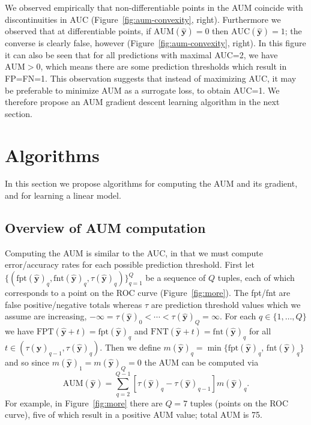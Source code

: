 \documentclass{article}
\begin{document}
We observed empirically that non-differentiable points in the AUM coincide with discontinuities in AUC (Figure~\ref{fig:aum-convexity}, right).
Furthermore we observed that at differentiable points, 
if $\text{AUM}(\mathbf{\hat y})=0$ then
$\text{AUC}(\mathbf{\hat y})=1$; 
the converse is clearly false, however (Figure~\ref{fig:aum-convexity}, right).
In this figure it can also be seen that for all predictions with maximal AUC=2, we have $\text{AUM}>0$, which means there are some prediction thresholds which result in FP=FN=1.
This observation suggests that instead of maximizing AUC, it may be preferable to minimize AUM as a surrogate loss, to obtain AUC=1. 
We therefore propose an AUM gradient descent learning algorithm in the next section.

\section{Algorithms}
\label{sec:algorithms}

In this section we propose algorithms for computing the AUM and its gradient, and for learning a linear model.

\subsection{Overview of AUM computation}
\label{sec:algo-aum-overview}
Computing the AUM is similar to the AUC, in that we must compute error/accuracy rates for each possible prediction threshold. 
First let $\{(
\text{fpt}
(\mathbf {\hat y})
_q, \text{fnt}
(\mathbf {\hat y})
_q,
 \tau
(\mathbf {\hat y})
_q
)\}_{q=1}^Q$ 
be a sequence of $Q$ tuples, each of which corresponds to a point on the ROC curve (Figure~\ref{fig:more}).
The fpt/fnt are false positive/negative totals whereas $\tau$ are prediction threshold values 
which we assume are increasing, $ -\infty = \tau
(\mathbf {\hat y})
_0 < \cdots <  \tau
(\mathbf {\hat y})
_Q = \infty$.
For each $q\in\{1,\dots,Q\}$ we have 
$\text{FPT}(\mathbf{\hat y}+t)=\text{fpt}(\mathbf {\hat y})_q$
and
$\text{FNT}(\mathbf{\hat y}+t)=\text{fnt}(\mathbf {\hat y})_q$
for all $t\in(\tau(\mathbf {\hat y})_{q-1}, \tau(\mathbf {\hat y})_q)$.
Then we define $m(\mathbf {\hat y})_q = \min\{
    \text{fpt}(\mathbf {\hat y})_q , \, 
    \text{fnt}(\mathbf {\hat y})_q
\}$ and so since 
$m(\mathbf {\hat y})_1=m(\mathbf {\hat y})_Q=0$ the AUM can be computed via
\begin{equation}
\label{eq:AUM-computation}
    \text{AUM}(\mathbf {\hat y}) =
    \sum_{q=2}^{Q-1}
    [ \tau(\mathbf {\hat y})_{q} - \tau(\mathbf {\hat y})_{q-1} ]
    m(\mathbf {\hat y})_q.
\end{equation}
For example, in Figure~\ref{fig:more} there are $Q=7$ tuples (points on the ROC curve), five of which result in a positive AUM value; total AUM is 75.
\end{document}

